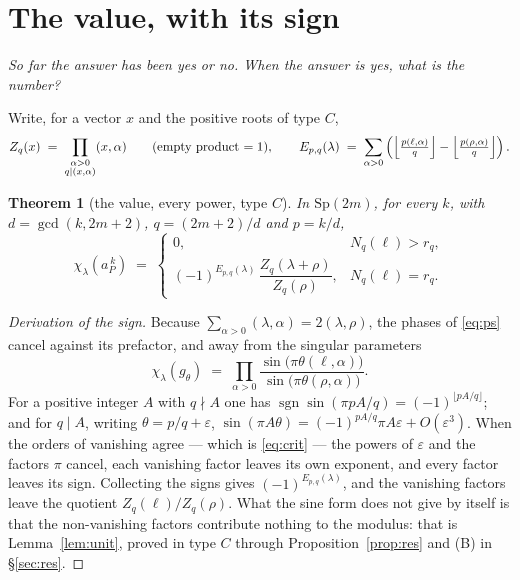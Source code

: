 \documentclass[11pt,a4paper]{article}
\newtheorem{theorem}{Theorem}[section]
\theoremstyle{definition}
\newcommand{\Sp}{\mathrm{Sp}}
\begin{document}
\section{The value, with its sign}\label{sec:valor}

\noindent\emph{So far the answer has been yes or no. When the answer is yes, what is the number?}

Write, for a vector $x$ and the positive roots of type $C$,
\[
Z_q(x)\;=\;\prod_{\substack{\alpha>0\\ q\mid(x,\alpha)}}(x,\alpha)
\qquad\text{(empty product $=1$)},
\qquad
E_{p,q}(\lambda)\;=\;\sum_{\alpha>0}\left(
\Bigl\lfloor\tfrac{p(\ell,\alpha)}{q}\Bigr\rfloor-\Bigl\lfloor\tfrac{p(\rho,\alpha)}{q}\Bigr\rfloor
\right).
\]

\begin{theorem}[the value, every power, type $C$]\label{thm:signo}
In $\Sp(2m)$, for every $k$, with $d=\gcd(k,2m+2)$, $q=(2m+2)/d$ and $p=k/d$,
\[
\boxed{\;
\chi_\lambda(a_P^{\,k})\;=\;
\begin{cases}
0, & N_q(\ell)>r_q,\\[2mm]
(-1)^{E_{p,q}(\lambda)}\,\dfrac{Z_q(\lambda+\rho)}{Z_q(\rho)}, & N_q(\ell)=r_q .
\end{cases}\;}
\]
\end{theorem}

\begin{proof}[Derivation of the sign]
Because $\sum_{\alpha>0}(\lambda,\alpha)=2(\lambda,\rho)$, the phases of \eqref{eq:ps} cancel
against its prefactor, and away from the singular parameters
\[
\chi_\lambda(g_\theta)\;=\;\prod_{\alpha>0}
\frac{\sin\bigl(\pi\theta(\ell,\alpha)\bigr)}{\sin\bigl(\pi\theta(\rho,\alpha)\bigr)} .
\]
For a positive integer $A$ with $q\nmid A$ one has
$\operatorname{sgn}\sin(\pi pA/q)=(-1)^{\lfloor pA/q\rfloor}$; and for $q\mid A$, writing
$\theta=p/q+\varepsilon$,
$\sin(\pi A\theta)=(-1)^{pA/q}\pi A\varepsilon+O(\varepsilon^3)$. When the orders of vanishing agree
--- which is \eqref{eq:crit} --- the powers of $\varepsilon$ and the factors $\pi$ cancel, each
vanishing factor leaves its own exponent, and every factor leaves its sign. Collecting the signs
gives $(-1)^{E_{p,q}(\lambda)}$, and the vanishing factors leave the quotient
$Z_q(\ell)/Z_q(\rho)$. What the sine form does not give by itself is that the non-vanishing factors
contribute nothing to the modulus: that is Lemma~\ref{lem:unit}, proved in type $C$ through
Proposition~\ref{prop:res} and (B) in \S\ref{sec:res}.
\end{proof}
\end{document}
